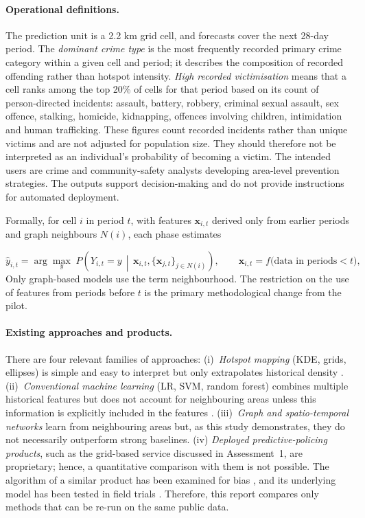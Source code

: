 \documentclass[11pt,a4paper]{report}
\begin{document}
\paragraph{Operational definitions.} 
The prediction unit is a 2.2 km grid cell, and forecasts cover the next 28-day period. The  \emph{dominant crime type} is the most frequently recorded primary crime category within a given cell and period; it describes the composition of recorded offending rather than hotspot intensity. \emph{High recorded victimisation} means that a cell ranks among the top 20\%  of cells for that period based on its count of person-directed incidents: assault, battery, robbery, criminal sexual assault, sex offence, stalking, homicide, kidnapping, offences involving children, intimidation and human trafficking. These figures count recorded incidents rather than unique victims and are not adjusted for population size. They should therefore not be interpreted as an individual's probability of becoming a victim. The intended users are crime and community-safety analysts developing area-level prevention strategies. The outputs support decision-making and do not provide instructions for automated deployment.

Formally, for cell  $i$ in period $t$, with features $\mathbf{x}_{i,t}$ derived only from earlier periods and graph neighbours $N(i)$, each phase estimates

\begin{equation}
\hat{y}_{i,t}=\arg\max_{y}\;P\!\left(Y_{i,t}=y \,\middle|\, \mathbf{x}_{i,t},\{\mathbf{x}_{j,t}\}_{j\in N(i)}\right),\qquad \mathbf{x}_{i,t}=f\big(\text{data in periods}<t\big),
\label{eq:problem}
\end{equation}
Only graph-based models use the term neighbourhood. The restriction on the use of features from periods before $t$ is the primary methodological change from the pilot.

\paragraph{Existing approaches and products.} There are four relevant families of approaches: (i)~\emph{Hotspot mapping} (KDE, grids, ellipses) is simple and easy to interpret but only extrapolates historical density \citep{chainey2008}. (ii)~\emph{Conventional machine learning} (LR, SVM, random forest) combines multiple historical features but does not account for neighbouring areas unless this information is explicitly included in the features \citep{zhang2020}. (iii)~\emph{Graph and spatio-temporal networks} learn from neighbouring areas \citep{kipf2017,han2020} but, as this study demonstrates, they do not necessarily outperform strong baselines. (iv) \emph{Deployed predictive-policing products}, such as the grid-based service discussed in Assessment~1, are proprietary; hence, a quantitative comparison with them is not possible. The algorithm of a similar product has been examined for bias \citep{lum2016}, and its underlying model has been tested in field trials \citep{mohler2015}. Therefore, this report compares only methods that can be re-run on the same public data.
\end{document}
